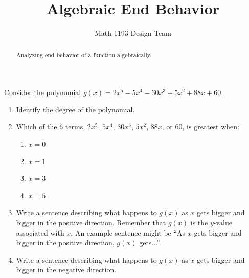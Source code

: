 \documentclass[noauthor]{ximera}
\title{Algebraic End Behavior}
\author{Math 1193 Design Team}
\begin{document}
\begin{abstract}
    Analyzing end behavior of a function algebraically.
\end{abstract}
\maketitle

Consider the polynomial \(g\left(x\right)=2x^5-5x^4-30x^3+5x^2+88x+60\).

\begin{enumerate}
    \item Identify the degree of the polynomial.
    \item Which of the 6 terms, \(2x^5\), \(5x^4\), \(30x^3\), \(5x^2\),
    \(88x\), or \(60\), is greatest when:
    \begin{enumerate}
        \item \(x = 0\)
        \item \(x = 1\)
        \item \(x = 3\)
        \item \(x = 5\)
    \end{enumerate}
    \item Write a sentence describing what happens to \(g\left(x\right)\) 
    as \(x\) gets bigger and bigger in the positive direction. 
    Remember that \(g(x)\) is the \(y\)-value associated with \(x\). 
    An example sentence might be ``As \(x\) gets bigger and bigger in 
    the positive direction, \(g(x)\) gets...''.
    \item Write a sentence describing what happens to \(g\left(x\right)\) 
    as \(x\) gets bigger and bigger in the negative direction. 
\end{enumerate}
\end{document}
